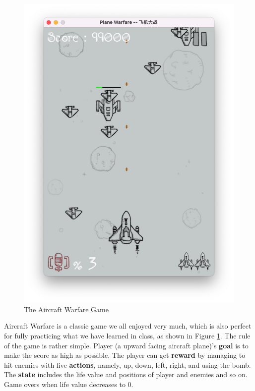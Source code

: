 \documentclass{article}
\begin{document}
\begin{figure}
    \centering
    \includegraphics[width=\linewidth]{pictures/game.jpg}
    \caption{The Aircraft Warfare Game}
    \label{fig:aircraft_warfare_game}
\end{figure}

\par Aircraft Warfare is a classic game we all enjoyed very much, which is also perfect for fully practicing what we have learned in class, as shown in Figure \ref{fig:aircraft_warfare_game}. The rule of the game is rather simple. Player (a upward facing aircraft plane)'s \textbf{goal} is to make the score as high as possible. The player can get \textbf{reward} by managing to hit enemies with five \textbf{actions}, namely, up, down, left, right, and using the bomb.  The \textbf{state} includes the life value and positions of player and enemies and so on. Game overs when life value decreases to 0.
\end{document}
